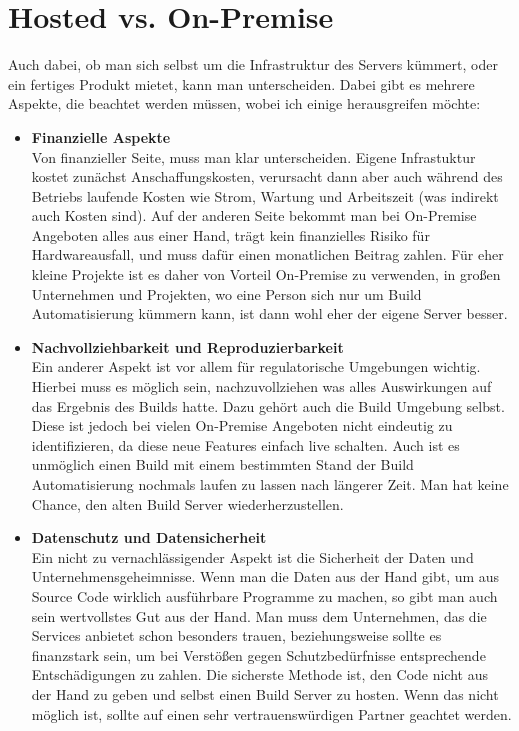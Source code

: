 \section{Hosted vs. On-Premise}
Auch dabei, ob man sich selbst um die Infrastruktur des Servers kümmert, oder ein fertiges Produkt mietet, kann man unterscheiden. Dabei gibt es mehrere Aspekte, die beachtet werden müssen, wobei ich einige herausgreifen möchte:
\begin{itemize}
	\item \textbf{Finanzielle Aspekte}\\
	Von finanzieller Seite, muss man klar unterscheiden. Eigene Infrastuktur kostet zunächst Anschaffungskosten, verursacht dann aber auch während des Betriebs laufende Kosten wie Strom, Wartung und Arbeitszeit (was indirekt auch Kosten sind). Auf der anderen Seite bekommt man bei On-Premise Angeboten alles aus einer Hand, trägt kein finanzielles Risiko für Hardwareausfall, und muss dafür einen monatlichen Beitrag zahlen. Für eher kleine Projekte ist es daher von Vorteil On-Premise zu verwenden, in großen Unternehmen und Projekten, wo eine Person sich nur um Build Automatisierung kümmern kann, ist dann wohl eher der eigene Server besser.
	\item \textbf{Nachvollziehbarkeit und Reproduzierbarkeit}\\
	Ein anderer Aspekt ist vor allem für regulatorische Umgebungen wichtig. Hierbei muss es möglich sein, nachzuvollziehen was alles Auswirkungen auf das Ergebnis des Builds hatte. Dazu gehört auch die Build Umgebung selbst. Diese ist jedoch bei vielen On-Premise Angeboten nicht eindeutig zu identifizieren, da diese neue Features einfach live schalten. Auch ist es unmöglich einen Build mit einem bestimmten Stand der Build Automatisierung nochmals laufen zu lassen nach längerer Zeit. Man hat keine Chance, den alten Build Server wiederherzustellen.
	\item \textbf{Datenschutz und Datensicherheit}\\
	Ein nicht zu vernachlässigender Aspekt ist die Sicherheit der Daten und Unternehmensgeheimnisse. Wenn man die Daten aus der Hand gibt, um aus Source Code wirklich ausführbare Programme zu machen, so gibt man auch sein wertvollstes Gut aus der Hand. Man muss dem Unternehmen, das die Services anbietet schon besonders trauen, beziehungsweise sollte es finanzstark sein, um bei Verstößen gegen Schutzbedürfnisse entsprechende Entschädigungen zu zahlen. Die sicherste Methode ist, den Code nicht aus der Hand zu geben und selbst einen Build Server zu hosten. Wenn das nicht möglich ist, sollte auf einen sehr vertrauenswürdigen Partner geachtet werden.
\end{itemize}
